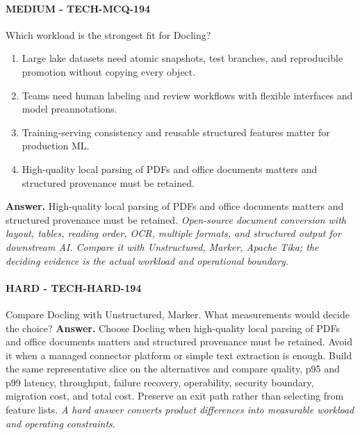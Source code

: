 \paragraph{MEDIUM - TECH-MCQ-194} Which workload is the strongest fit for Docling?
\begin{enumerate}[label=\Alph*.]
\item Large lake datasets need atomic snapshots, test branches, and reproducible promotion without copying every object.
\item Teams need human labeling and review workflows with flexible interfaces and model preannotations.
\item Training-serving consistency and reusable structured features matter for production ML.
\item High-quality local parsing of PDFs and office documents matters and structured provenance must be retained.
\end{enumerate}
\textbf{Answer.} High-quality local parsing of PDFs and office documents matters and structured provenance must be retained.
\textit{Open-source document conversion with layout, tables, reading order, OCR, multiple formats, and structured output for downstream AI. Compare it with Unstructured, Marker, Apache Tika; the deciding evidence is the actual workload and operational boundary.}
\paragraph{HARD - TECH-HARD-194} Compare Docling with Unstructured, Marker. What measurements would decide the choice?
\textbf{Answer.} Choose Docling when high-quality local parsing of PDFs and office documents matters and structured provenance must be retained. Avoid it when a managed connector platform or simple text extraction is enough. Build the same representative slice on the alternatives and compare quality, p95 and p99 latency, throughput, failure recovery, operability, security boundary, migration cost, and total cost. Preserve an exit path rather than selecting from feature lists.
\textit{A hard answer converts product differences into measurable workload and operating constraints.}
